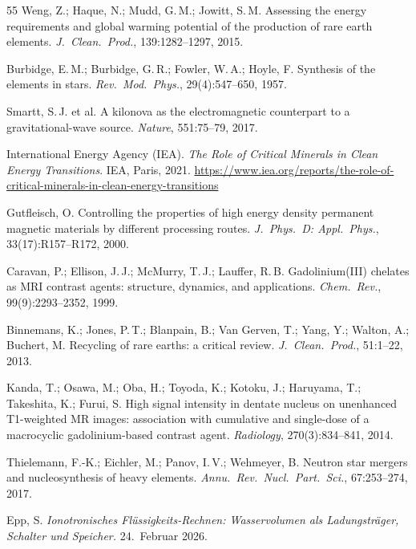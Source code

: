 ﻿\documentclass[12pt, a4paper]{report}
\theoremstyle{definition}
\theoremstyle{remark}
\begin{document}
\begin{thebibliography}{55}
  Weng, Z.; Haque, N.; Mudd, G.\,M.; Jowitt, S.\,M.
  Assessing the energy requirements and global warming potential of the
  production of rare earth elements.
  \textit{J.\ Clean.\ Prod.}, 139:1282--1297, 2015.

  Burbidge, E.\,M.; Burbidge, G.\,R.; Fowler, W.\,A.; Hoyle, F.
  Synthesis of the elements in stars.
  \textit{Rev.\ Mod.\ Phys.}, 29(4):547--650, 1957.

  Smartt, S.\,J. et al.
  A kilonova as the electromagnetic counterpart to a gravitational-wave source.
  \textit{Nature}, 551:75--79, 2017.

  International Energy Agency (IEA).
  \textit{The Role of Critical Minerals in Clean Energy Transitions}.
  IEA, Paris, 2021.
  {\small\url{https://www.iea.org/reports/the-role-of-critical-minerals-in-clean-energy-transitions}}

  Gutfleisch, O.
  Controlling the properties of high energy density permanent magnetic materials
  by different processing routes.
  \textit{J.\ Phys.\ D: Appl.\ Phys.}, 33(17):R157--R172, 2000.

  Caravan, P.; Ellison, J.\,J.; McMurry, T.\,J.; Lauffer, R.\,B.
  Gadolinium(III) chelates as MRI contrast agents: structure, dynamics,
  and applications.
  \textit{Chem.\ Rev.}, 99(9):2293--2352, 1999.

  Binnemans, K.; Jones, P.\,T.; Blanpain, B.; Van Gerven, T.;
  Yang, Y.; Walton, A.; Buchert, M.
  Recycling of rare earths: a critical review.
  \textit{J.\ Clean.\ Prod.}, 51:1--22, 2013.

  Kanda, T.; Osawa, M.; Oba, H.; Toyoda, K.; Kotoku, J.; Haruyama, T.;
  Takeshita, K.; Furui, S.
  High signal intensity in dentate nucleus on unenhanced T1-weighted
  MR images: association with cumulative and single-dose of a
  macrocyclic gadolinium-based contrast agent.
  \textit{Radiology}, 270(3):834--841, 2014.

  Thielemann, F.-K.; Eichler, M.; Panov, I.\,V.; Wehmeyer, B.
  Neutron star mergers and nucleosynthesis of heavy elements.
  \textit{Annu.\ Rev.\ Nucl.\ Part.\ Sci.}, 67:253--274, 2017.

  Epp, S.
  \textit{Ionotronisches Flüssigkeits-Rechnen: Wasservolumen als
  Ladungsträger, Schalter und Speicher.} 24.~Februar 2026.

\end{thebibliography}

\end{document}
